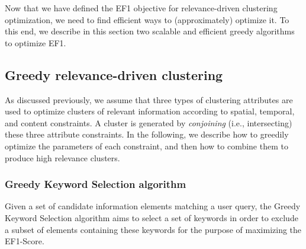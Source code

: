 Now that we have defined the EF1 objective for relevance-driven clustering optimization, we need to find efficient ways to (approximately) optimize it.  To this end, we describe in this section  two scalable and efficient greedy algorithms to optimize EF1.

\subsection{Greedy relevance-driven clustering}


As discussed previously, we assume that three types of clustering attributes are used to optimize clusters of relevant information according to spatial, temporal, and content constraints.  A cluster is generated by \emph{conjoining} (i.e., intersecting) these three attribute constraints. In the following, we describe how to greedily optimize the parameters of each constraint, and then how to combine them to produce high relevance clusters.

\subsubsection{Greedy Keyword Selection algorithm}

Given a set of candidate information elements matching a user query, the Greedy Keyword Selection algorithm aims to select a set of keywords in order to exclude a subset of elements containing these keywords for the purpose of maximizing the EF1-Score.

